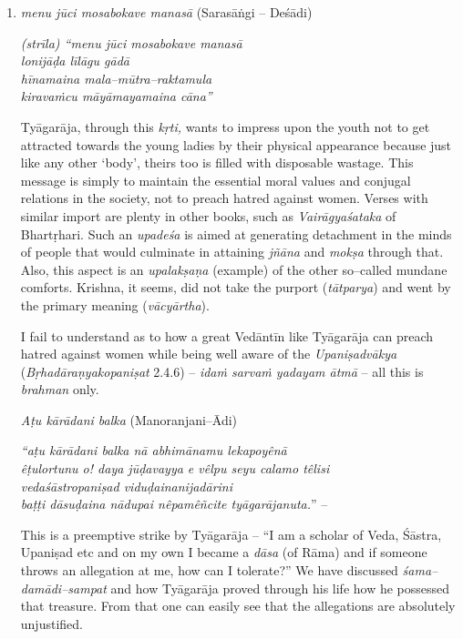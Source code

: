 \begin{enumerate}
\item 
 \textit{menu jūci mosabokave manasā} (Sarasāṅgi – Deśādi)

\begin{myquote}
\textit{(strīla) “menu jūci mosabokave manasā}\\\textit{lonijāḍa līlāgu gādā}\\\textit{hīnamaina mala–mūtra–raktamula}\\\textit{kiravaṁcu māyāmayamaina cāna”}
\end{myquote}

 Tyāgarāja, through this \textit{kṛti,} wants to impress upon the youth not to get attracted towards the young ladies by their physical appearance because just like any other ‘body’, theirs too is filled with disposable wastage. This message is simply to maintain the essential moral values and conjugal relations in the society, not to preach hatred against women. Verses with similar import are plenty in other books, such as \textit{Vairāgyaśataka} of Bhartṛhari. Such an \textit{upadeśa} is aimed at generating detachment in the minds of people that would culminate in attaining \textit{jñāna} and \textit{mokṣa} through that. Also, this aspect is an \textit{upalakṣaṇa} (example) of the other so–called mundane comforts. Krishna, it seems, did not take the purport (\textit{tātparya}) and went by the primary meaning (\textit{vācyārtha}).

 I fail to understand as to how a great Vedāntīn like Tyāgarāja can preach hatred against women while being well aware of the \textit{Upaniṣadvākya} (\textit{Bṛhadāraṇyakopaniṣat} 2.4.6) – \textit{idaṁ sarvaṁ yadayam ātmā} – all this is \textit{brahman} only.

 \newpage

 \textit{Aṭu kārādani balka} (Manoranjani–Ādi)

\begin{myquote}
\textit{“aṭu kārādani balka nā abhimānamu lekapoyênā} \\\textit{êṭulortunu o! daya jūḍavayya e vêlpu seyu calamo têlisi}\\\textit{vedaśāstropaniṣad viduḍainanijadārini} \\\textit{baṭṭi dāsuḍaina nādupai nêpamêñcite tyāgarājanuta.}” –
\end{myquote}

 This is a preemptive strike by Tyāgarāja – “I am a scholar of Veda, Śāstra, Upaniṣad etc and on my own I became a \textit{dāsa} (of Rāma) and if someone throws an allegation at me, how can I tolerate?” We have discussed \textit{śama–damādi–sampat} and how Tyāgarāja proved through his life how he possessed that treasure. From that one can easily see that the allegations are absolutely unjustified.


\end{enumerate}
